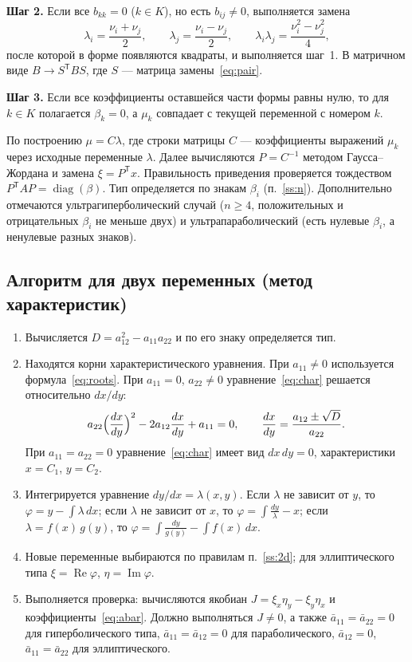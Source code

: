 \documentclass[a4paper,12pt]{article}
\DeclareMathOperator{\diag}{diag}
\renewcommand{\Re}{\operatorname{Re}}
\renewcommand{\Im}{\operatorname{Im}}
\begin{document}
\textbf{Шаг 2.} Если все $b_{kk}=0$ ($k\in K$), но есть $b_{ij}\neq0$, выполняется
замена
\begin{equation}\label{eq:pair}
  \lambda_i=\frac{\nu_i+\nu_j}{2},\qquad \lambda_j=\frac{\nu_i-\nu_j}{2},
  \qquad \lambda_i\lambda_j=\frac{\nu_i^2-\nu_j^2}{4},
\end{equation}
после которой в форме появляются квадраты, и выполняется шаг~1. В матричном виде
$B\to S^{\mathsf T}BS$, где $S$ --- матрица замены~\eqref{eq:pair}.

\textbf{Шаг 3.} Если все коэффициенты оставшейся части формы равны нулю, то для
$k\in K$ полагается $\beta_k=0$, а $\mu_k$ совпадает с текущей переменной
с номером $k$.

По построению $\mu=C\lambda$, где строки матрицы $C$ --- коэффициенты выражений
$\mu_k$ через исходные переменные $\lambda$. Далее вычисляются $P=C^{-1}$ методом
Гаусса--Жордана и замена $\xi=P^{\mathsf T}x$. Правильность приведения проверяется
тождеством $P^{\mathsf T}\!AP=\diag(\beta)$. Тип определяется по знакам $\beta_i$
(п.~\ref{ss:n}). Дополнительно отмечаются ультрагиперболический случай ($n\ge4$,
положительных и отрицательных $\beta_i$ не меньше двух) и ультрапараболический
(есть нулевые $\beta_i$, а ненулевые разных знаков).

\subsection{Алгоритм для двух переменных (метод характеристик)}

\begin{enumerate}
  \item Вычисляется $D=a_{12}^2-a_{11}a_{22}$ и по его знаку определяется тип.
  \item Находятся корни характеристического уравнения. При $a_{11}\neq0$
        используется формула~\eqref{eq:roots}. При $a_{11}=0$, $a_{22}\neq0$
        уравнение~\eqref{eq:char} решается относительно $dx/dy$:
        \[
          a_{22}\Bigl(\frac{dx}{dy}\Bigr)^2-2a_{12}\frac{dx}{dy}+a_{11}=0,
          \qquad
          \frac{dx}{dy}=\frac{a_{12}\pm\sqrt{D}}{a_{22}}.
        \]
        При $a_{11}=a_{22}=0$ уравнение~\eqref{eq:char} имеет вид $dx\,dy=0$,
        характеристики $x=C_1$, $y=C_2$.
  \item Интегрируется уравнение $dy/dx=\lambda(x,y)$. Если $\lambda$ не зависит
        от $y$, то $\varphi=y-\int\lambda\,dx$; если $\lambda$ не зависит от $x$, то
        $\varphi=\int\frac{dy}{\lambda}-x$; если $\lambda=f(x)\,g(y)$, то
        $\varphi=\int\frac{dy}{g(y)}-\int f(x)\,dx$.
  \item Новые переменные выбираются по правилам п.~\ref{ss:2d}; для
        эллиптического типа $\xi=\Re\varphi$, $\eta=\Im\varphi$.
  \item Выполняется проверка: вычисляются якобиан $J=\xi_x\eta_y-\xi_y\eta_x$ и
        коэффициенты~\eqref{eq:abar}. Должно выполняться $J\neq0$, а также
        $\bar a_{11}=\bar a_{22}=0$ для гиперболического типа,
        $\bar a_{11}=\bar a_{12}=0$ для параболического,
        $\bar a_{12}=0$, $\bar a_{11}=\bar a_{22}$ для эллиптического.
\end{enumerate}
\end{document}
